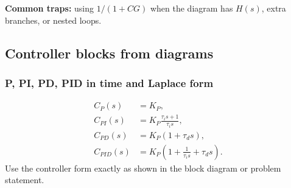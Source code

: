 \textbf{Common traps:} using \(1/(1+CG)\) when the diagram has \(H(s)\), extra branches, or nested loops.

\subsection{Controller blocks from diagrams}

\subsubsection{P, PI, PD, PID in time and Laplace form}
\[
\begin{aligned}
C_P(s)&=K_P,\\
C_{PI}(s)&=K_P\frac{\tau_i s+1}{\tau_i s},\\
C_{PD}(s)&=K_P(1+\tau_d s),\\
C_{PID}(s)&=K_P\left(1+\frac{1}{\tau_i s}+\tau_d s\right).
\end{aligned}
\]
Use the controller form exactly as shown in the block diagram or problem statement.
